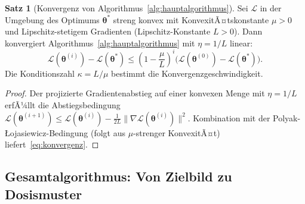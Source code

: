 ﻿\documentclass[a4paper,12pt]{article}
\theoremstyle{definition}
\newtheorem{satz}{Satz}[section]
\newcommand{\vect}[1]{\bm{#1}}
\begin{document}
	\begin{satz}[Konvergenz von Algorithmus~\ref{alg:hauptalgorithmus}]
		\label{satz:hauptkonvergenz}
		Sei $\mathcal{L}$ in der Umgebung des Optimums $\vect{\theta}^*$ streng konvex
		mit KonvexitÃ¤tskonstante $\mu > 0$ und Lipschitz-stetigem Gradienten
		(Lipschitz-Konstante $L > 0$). Dann konvergiert Algorithmus~\ref{alg:hauptalgorithmus}
		mit $\eta = 1/L$ linear:
		\begin{equation}
			\mathcal{L}(\vect{\theta}^{(i)}) - \mathcal{L}(\vect{\theta}^*)
			\leq \left(1 - \frac{\mu}{L}\right)^i
			\bigl(\mathcal{L}(\vect{\theta}^{(0)}) - \mathcal{L}(\vect{\theta}^*)\bigr).
			\label{eq:konvergenz}
		\end{equation}
		Die Konditionszahl $\kappa = L/\mu$ bestimmt die Konvergenzgeschwindigkeit.
	\end{satz}
	
	\begin{proof}
		Der projizierte Gradientenabstieg auf einer konvexen Menge mit $\eta = 1/L$
		erfÃ¼llt die Abstiegsbedingung
		$\mathcal{L}(\vect{\theta}^{(i+1)}) \leq \mathcal{L}(\vect{\theta}^{(i)})
		- \frac{1}{2L}\|\nabla\mathcal{L}(\vect{\theta}^{(i)})\|^2$.
		Kombination mit der Polyak-\L{}ojasiewicz-Bedingung (folgt aus $\mu$-strenger
		KonvexitÃ¤t) liefert~\eqref{eq:konvergenz}.
	\end{proof}
	
	\subsection{Gesamtalgorithmus: Von Zielbild zu Dosismuster}
	
\end{document}
